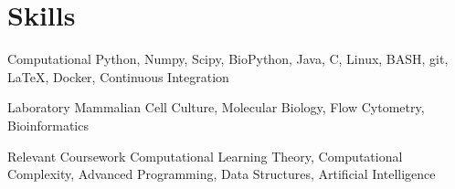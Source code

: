 \documentclass{bscv}
\begin{document}
\section{Skills}

\begin{factlist}

\item{Computational}
     {Python, Numpy, Scipy, BioPython, Java, C, Linux, BASH, git, \LaTeX, Docker, Continuous Integration}

\item{Laboratory}
  { Mammalian Cell Culture, Molecular Biology, Flow Cytometry, Bioinformatics }

\item{Relevant Coursework}
 { Computational Learning Theory, Computational Complexity, Advanced Programming, Data Structures, Artificial Intelligence }
\end{factlist}
  
\end{document}
